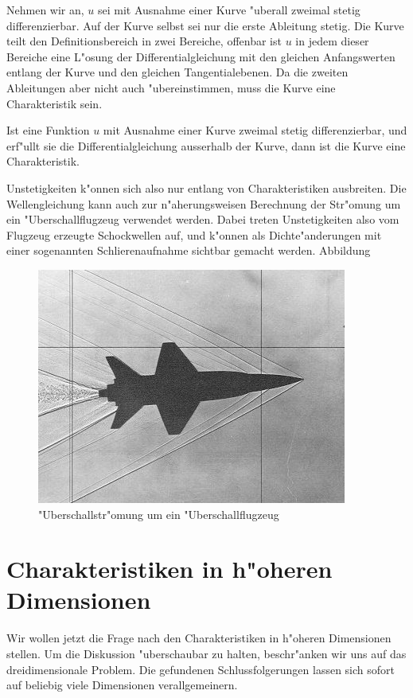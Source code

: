 Nehmen wir an, $u$ sei mit Ausnahme einer Kurve "uberall zweimal
stetig differenzierbar.
Auf der Kurve selbst sei nur die erste Ableitung stetig.
Die Kurve teilt den Definitionsbereich in zwei
Bereiche, offenbar ist $u$ in jedem dieser Bereiche eine 
L"osung der Differentialgleichung mit den gleichen Anfangswerten
entlang der Kurve und den gleichen Tangentialebenen.
Da die zweiten Ableitungen aber nicht auch "ubereinstimmen, muss
die Kurve eine Charakteristik sein.



\begin{satz}
Ist eine Funktion $u$ mit Ausnahme einer Kurve zweimal stetig
differenzierbar, und erf"ullt sie die Differentialgleichung
ausserhalb der Kurve, dann ist die Kurve eine Charakteristik.
\end{satz}
Unstetigkeiten k"onnen sich also nur entlang von Charakteristiken
ausbreiten.
Die Wellengleichung kann auch zur n"aherungsweisen
Berechnung der Str"omung um ein "Uberschallflugzeug verwendet werden.
Dabei treten Unstetigkeiten also vom Flugzeug erzeugte Schockwellen
auf, und k"onnen als Dichte"anderungen mit einer
sogenannten Schlierenaufnahme sichtbar gemacht werden.
Abbildung 

\begin{figure}
\begin{center}
\includegraphics[width=0.8\hsize]{graphics/i-5-1}
\end{center}
\caption{"Uberschallstr"omung um ein "Uberschallflugzeug\label{ueberschall2d}}
\end{figure}

\section{Charakteristiken in h"oheren Dimensionen}
Wir wollen jetzt die Frage nach den Charakteristiken in h"oheren Dimensionen
stellen. Um die Diskussion "uberschaubar zu halten, beschr"anken wir uns auf
das dreidimensionale Problem. Die gefundenen Schlussfolgerungen 
lassen sich sofort auf beliebig viele Dimensionen verallgemeinern.

